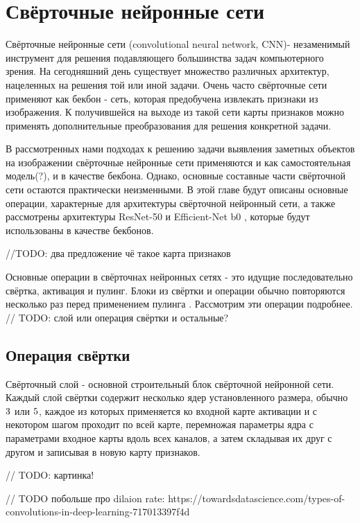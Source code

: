 \section{Свёрточные нейронные сети}


Свёрточные нейронные сети (convolutional neural network, CNN)- незаменимый инструмент для решения подавляющего большинства задач компьютерного зрения. 
На сегодняшний день существует множество различных архитектур, нацеленных на решения той или иной задачи. 
Очень часто свёрточные сети применяют как бекбон - сеть, которая предобучена извлекать признаки из изображения. К получившейся 
на выходе из такой сети карты признаков можно применять дополнительные преобразования для решения конкретной задачи. 

В рассмотренных нами подходах к решению задачи выявления заметных объектов на изображении свёрточные нейронные сети 
применяются и как самостоятельная модель(?), и в качестве бекбона. Однако, основные составные части свёрточной сети 
остаются практически неизменными. В этой главе будут описаны основные операции, характерные для архитектуры свёрточной нейронный сети,
а также рассмотрены архитектуры ResNet-50\cite{ResNet} и Efficient-Net b0 \cite{Efficientnet}, которые будут использованы в качестве 
бекбонов.

//TODO: два предложение чё такое карта признаков

Основные операции в свёрточнах нейронных сетях - это идущие последовательно свёртка, активация и пулинг. Блоки из свёртки и операции
обычно повторяются несколько раз перед применением пулинга \cite{ResNet}. Рассмотрим эти операции подробнее.
// TODO: слой или операция свёртки и остальные? 

\subsection{Операция свёртки}

Свёрточный слой - основной строительный блок свёрточной нейронной сети. Каждый слой свёртки содержит несколько ядер установленного размера,
обычно $3 \time 3$ или $5 \time 5$, каждое из которых применяется ко входной карте активации и с некотором шагом проходит по всей карте,
перемножая параметры ядра с параметрами входное карты вдоль всех каналов, а затем складывая их друг с другом и записывая в новую карту признаков.

// TODO: картинка!


// TODO побольше про dilaion rate: https://towardsdatascience.com/types-of-convolutions-in-deep-learning-717013397f4d

